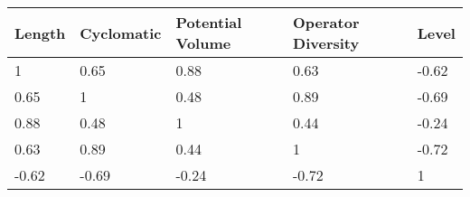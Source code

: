 \begin{tabular}{lllll}
Length & Cyclomatic & Potential Volume & Operator Diversity & Level \\ 
\hline 
1 & 0.65 & 0.88 & 0.63 & -0.62 \\ 
0.65 & 1 & 0.48 & 0.89 & -0.69 \\ 
0.88 & 0.48 & 1 & 0.44 & -0.24 \\ 
0.63 & 0.89 & 0.44 & 1 & -0.72 \\ 
-0.62 & -0.69 & -0.24 & -0.72 & 1 \\ 
\hline 
\end{tabular}